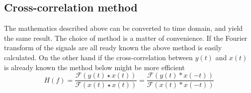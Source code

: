 \subsection{Cross-correlation method}
The mathematics described above can be converted to time domain, and yield the same result. The choice of method is a matter of convenience. If the Fourier transform of the signals are all ready known the above method is easily calculated. On the other hand if the cross-correlation between $y(t)$ and $x(t)$ is already known the method below might be more efficient
\begin{equation}
H(f)=\dfrac{\mathscr{F}(y(t)\star x(t))} {\mathscr{F}(x(t)\star x(t))}=
\dfrac{\mathscr{F}(y(t)\ast x(-t))} {\mathscr{F}(x(t)\ast x(-t))}
\label{Eq:Xcorr method}
\end{equation}  
 
